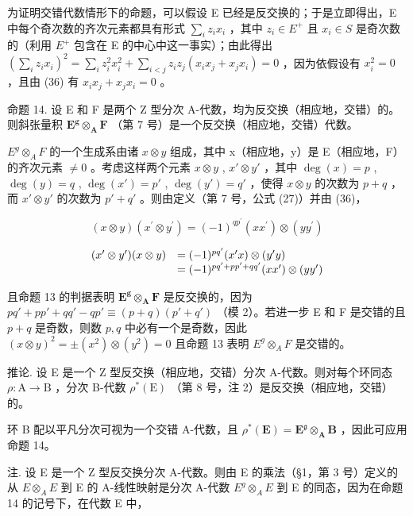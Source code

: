 为证明交错代数情形下的命题，可以假设 E 已经是反交换的；于是立即得出，E 中每个奇次数的齐次元素都具有形式 \(\sum_{i} z_{i} x_{i}\) ，其中 \(z_{i} \in E^{+}\) 且 \(x_{i} \in S\) 是奇次数的（利用 \(E^{+}\) 包含在 E 的中心中这一事实）；由此得出 \(\left(\sum_{i} z_{i} x_{i}\right)^{2} = \sum_{i} z_{i}^{2} x_{i}^{2} + \sum_{i < j} z_{i} z_{j} (x_{i} x_{j} + x_{j} x_{i}) = 0\) ，因为依假设有 \(x_{i}^{2} = 0\) ，且由 (36) 有 \(x_{i} x_{j} + x_{j} x_{i} = 0\) 。

命题 14. 设 E 和 F 是两个 Z 型分次 A-代数，均为反交换（相应地，交错）的。则斜张量积 \(\mathbf{E}^{\mathbf{g}}\otimes_{\mathbf{A}}\mathbf{F}\) （第 7 号）是一个反交换（相应地，交错）代数。

\(E^{g} \otimes_{A} F\) 的一个生成系由诸 \(x \otimes y\) 组成，其中 x（相应地，y）是 E（相应地，F）的齐次元素 \(\neq 0\) 。考虑这样两个元素 \(x \otimes y\) , \(x' \otimes y'\) ，其中 \(\deg(x) = p\) , \(\deg(y) = q\) , \(\deg(x') = p'\) , \(\deg(y') = q'\) ，使得 \(x \otimes y\) 的次数为 \(p + q\) ，而 \(x' \otimes y'\) 的次数为 \(p' + q'\) 。则由定义（第 7 号，公式 (27)）并由 (36)，

\[
(x \otimes y) (x ^ {\prime} \otimes y ^ {\prime}) = (- 1) ^ {q p ^ {\prime}} (x x ^ {\prime}) \otimes (y y ^ {\prime})
\]

\[
\begin{array}{r l} (x ^ {\prime} \otimes y ^ {\prime}) (x \otimes y) & = (- 1) ^ {p q ^ {\prime}} (x ^ {\prime} x) \otimes (y ^ {\prime} y) \\ & = (- 1) ^ {p q ^ {\prime} + p p ^ {\prime} + q q ^ {\prime}} (x x ^ {\prime}) \otimes (y y ^ {\prime}) \end{array}
\]

且命题 13 的判据表明 \(\mathbf{E}^{\mathbf{g}}\otimes_{\mathbf{A}}\mathbf{F}\) 是反交换的，因为 \(pq' + p p' + qq' - q p' \equiv (p + q)(p' + q')\) （模 2）。若进一步 E 和 F 是交错的且 \(p + q\) 是奇数，则数 \(p, q\) 中必有一个是奇数，因此 \((x \otimes y)^2 = \pm (x^2) \otimes (y^2) = 0\) 且命题 13 表明 \(E^g \otimes_A F\) 是交错的。

推论. 设 E 是一个 Z 型反交换（相应地，交错）分次 A-代数。则对每个环同态 \(\rho: \mathrm{A} \to \mathrm{B}\) ，分次 B-代数 \(\rho^{*}(\mathrm{E})\) （第 8 号，注 2）是反交换（相应地，交错）的。

环 B 配以平凡分次可视为一个交错 A-代数，且 \(\rho^{*}(\mathbf{E}) = \mathbf{E}^{\mathfrak{g}}\otimes_{\mathbf{A}}\mathbf{B}\) ，因此可应用命题 14。

注. 设 E 是一个 Z 型反交换分次 A-代数。则由 E 的乘法（§1，第 3 号）定义的从 \(E \otimes_{A} E\) 到 E 的 A-线性映射是分次 A-代数 \(E^{g} \otimes_{A} E\) 到 E 的同态，因为在命题 14 的记号下，在代数 E 中，

